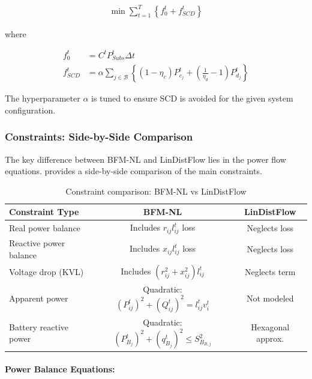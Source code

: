 \begin{align}
    \min \sum_{t = 1}^{T} \left\{ f_0^t + f_{SCD}^t \right\}
    \label{eq:mpopf-tradeoffs-objective}
\end{align}

where

\begin{align}
    f_0^t &= C^t P^t_{Subs} \Delta t \nonumber \\
    f_{SCD}^t &= \alpha \sum_{j \in \mathcal{B}} \left\{ (1-\eta_c)P^t_{c_j} + \left( \frac{1}{\eta_d} - 1 \right) P^t_{d_j} \right\} \nonumber
\end{align}

The hyperparameter $\alpha$ is tuned to ensure SCD is avoided for the given system configuration.

\subsubsection{Constraints: Side-by-Side Comparison}

The key difference between BFM-NL and LinDistFlow lies in the power flow equations.  provides a side-by-side comparison of the main constraints.

\begin{table}[t]
    \centering
    \caption{Constraint comparison: BFM-NL vs LinDistFlow}
    \label{table:mpopf-constraint-comparison}
    \begin{tabular}{|l|c|c|}
    \hline
    \textbf{Constraint Type} & \textbf{BFM-NL} & \textbf{LinDistFlow} \\ \hline
    Real power balance & Includes \(r_{ij}l_{ij}^t\) loss & Neglects loss \\ \hline
    Reactive power balance & Includes \(x_{ij}l_{ij}^t\) loss & Neglects loss \\ \hline
    Voltage drop (KVL) & Includes \((r_{ij}^2 + x_{ij}^2)l_{ij}^t\) & Neglects term \\ \hline
    Apparent power & Quadratic: \((P_{ij}^t)^2 + (Q_{ij}^t)^2 = l_{ij}^t v_i^t\) & Not modeled \\ \hline
    Battery reactive power & Quadratic: \((P_{B_j}^t)^2 + (q_{B_j}^t)^2 \leq S_{B_{R,j}}^2\) & Hexagonal approx. \\ \hline
    \end{tabular}
\end{table}

\paragraph{Power Balance Equations:}

